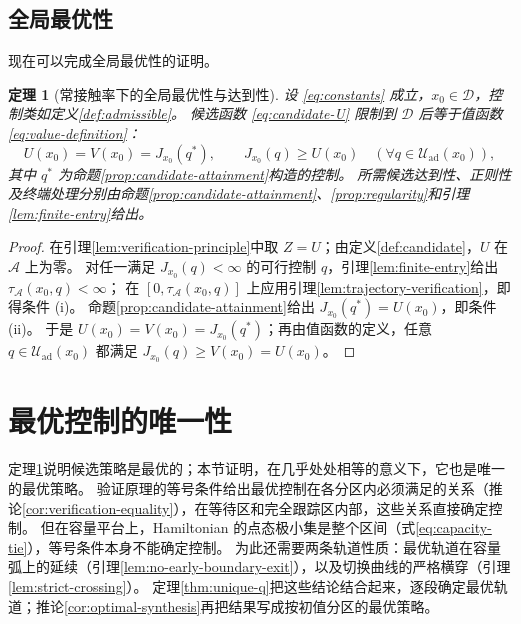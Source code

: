 \documentclass[11pt,a4paper,UTF8]{ctexart}
\newtheorem{theorem}{定理}[section]
\theoremstyle{definition}
\newcommand{\Acal}{\mathcal A}
\newcommand{\Dcal}{\mathcal D}
\newcommand{\Uad}{\mathcal U_{\mathrm{ad}}}
\begin{document}
\subsection{全局最优性}
\label{sec:global-verification}
现在可以完成全局最优性的证明。

\begin{theorem}[常接触率下的全局最优性与达到性]
\label{thm:verification}
设 \eqref{eq:constants} 成立，$x_0\in\Dcal$，控制类如定义\ref{def:admissible}。
候选函数 \eqref{eq:candidate-U} 限制到 $\Dcal$ 后等于值函数 \eqref{eq:value-definition}：
\begin{equation}
U(x_0)=V(x_0)=J_{x_0}(q^*),\qquad
J_{x_0}(q)\ge U(x_0)\quad(\forall q\in\Uad(x_0)),
\label{eq:global-optimality}
\end{equation}
其中 $q^*$ 为命题\ref{prop:candidate-attainment}构造的控制。
所需候选达到性、正则性及终端处理分别由命题\ref{prop:candidate-attainment}、\ref{prop:regularity}和引理\ref{lem:finite-entry}给出。
\end{theorem}
\begin{proof}
在引理\ref{lem:verification-principle}中取 $Z=U$；由定义\ref{def:candidate}，$U$ 在 $\Acal$ 上为零。
对任一满足 $J_{x_0}(q)<\infty$ 的可行控制 $q$，引理\ref{lem:finite-entry}给出 $\tau_{\Acal}(x_0,q)<\infty$；
在 $[0,\tau_{\Acal}(x_0,q)]$ 上应用引理\ref{lem:trajectory-verification}，即得条件 (i)。
命题\ref{prop:candidate-attainment}给出 $J_{x_0}(q^*)=U(x_0)$，即条件 (ii)。
于是 $U(x_0)=V(x_0)=J_{x_0}(q^*)$；再由值函数的定义，任意 $q\in\Uad(x_0)$ 都满足 $J_{x_0}(q)\ge V(x_0)=U(x_0)$。
\end{proof}

\section{最优控制的唯一性}
\label{sec:uniqueness}

定理\ref{thm:verification}说明候选策略是最优的；本节证明，在几乎处处相等的意义下，它也是唯一的最优策略。
验证原理的等号条件给出最优控制在各分区内必须满足的关系（推论\ref{cor:verification-equality}），在等待区和完全跟踪区内部，这些关系直接确定控制。
但在容量平台上，Hamiltonian 的点态极小集是整个区间（式\eqref{eq:capacity-tie}），等号条件本身不能确定控制。
为此还需要两条轨道性质：最优轨道在容量弧上的延续（引理\ref{lem:no-early-boundary-exit}），以及切换曲线的严格横穿（引理\ref{lem:strict-crossing}）。
定理\ref{thm:unique-q}把这些结论结合起来，逐段确定最优轨道；推论\ref{cor:optimal-synthesis}再把结果写成按初值分区的最优策略。
\end{document}
